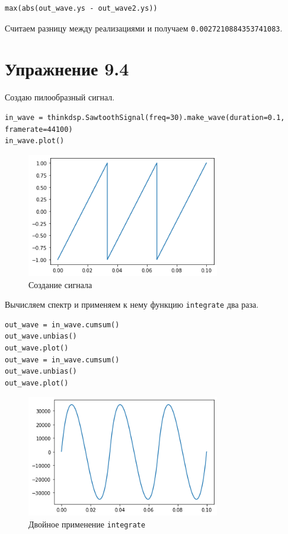 \documentclass[a4paper,12pt]{report}
\begin{document}
\begin{lstlisting}[caption=Разница между реализациями]
max(abs(out_wave.ys - out_wave2.ys))
\end{lstlisting}

Считаем разницу между реализациями и получаем \texttt{0.0027210884353741083}.

\chapter{Упражнение 9.4}

Создаю пилообразный сигнал.

\begin{lstlisting}[caption=Создание сигнала]
in_wave = thinkdsp.SawtoothSignal(freq=30).make_wave(duration=0.1, framerate=44100)
in_wave.plot()
\end{lstlisting}

\begin{figure}[H]
        \centering
        \includegraphics[width=0.75\textwidth]{8.png}
        \caption{Создание сигнала}
        \label{8}
\end{figure}

Вычисляем спектр и применяем к нему функцию \texttt{integrate} два раза.

\begin{lstlisting}[caption=двойное применение \texttt{integrate}]
out_wave = in_wave.cumsum()
out_wave.unbias()
out_wave.plot()
out_wave = in_wave.cumsum()
out_wave.unbias()
out_wave.plot()
\end{lstlisting}

\begin{figure}[H]
        \centering
        \includegraphics[width=0.75\textwidth]{9.png}
        \caption{Двойное применение \texttt{integrate}}
        \label{9}
\end{figure}
\end{document}
